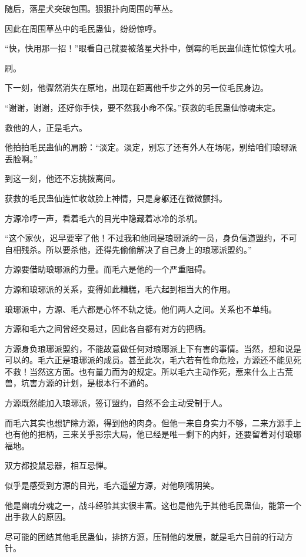 \begin{this_body}
随后，落星犬突破包围。狠狠扑向周围的草丛。

因此在周围草丛中的毛民蛊仙，纷纷惊呼。

“快，快用那一招！”眼看自己就要被落星犬扑中，倒霉的毛民蛊仙连忙惊惶大吼。

刷。

下一刻，他骤然消失在原地，出现在距离他千步之外的另一位毛民身边。

“谢谢，谢谢，还好你手快，要不然我小命不保。”获救的毛民蛊仙惊魂未定。

救他的人，正是毛六。

他拍拍毛民蛊仙的肩膀：“淡定。淡定，别忘了还有外人在场呢，别给咱们琅琊派丢脸啊。”

到这一刻，他还不忘挑拨离间。

获救的毛民蛊仙连忙收敛脸上神情，只是身躯还在微微颤抖。

方源冷哼一声，看着毛六的目光中隐藏着冰冷的杀机。

“这个家伙，迟早要宰了他！不过我和他同是琅琊派的一员，身负信道盟约，不可自相残杀。所以要杀他，还得先偷偷解决了自己身上的琅琊派盟约。”

方源要借助琅琊派的力量。而毛六是他的一个严重阻碍。

方源和琅琊派的关系，变得如此糟糕，毛六起到相当大的作用。

琅琊派中，方源、毛六都是心怀不轨之徒。他们两人之间。关系也不单纯。

方源和毛六之间曾经交易过，因此各自都有对方的把柄。

方源身负琅琊派盟约，不能故意做任何对琅琊派上下有害的事情。当然，想和说是可以的。毛六正是琅琊派的成员。甚至此次，毛六若有性命危险，方源还不能见死不救！当然这方面。也有量力而为的规定。所以毛六主动作死，惹来什么上古荒兽，坑害方源的计划，是根本行不通的。

方源既然能加入琅琊派，签订盟约，自然不会主动受制于人。

而毛六其实也想铲除方源，得到他的肉身。但他一来自身实力不够，二来方源手上也有他的把柄，三来关乎影宗大局，他已经是唯一剩下的内奸，还要留着对付琅琊福地。

双方都投鼠忌器，相互忌惮。

似乎是感受到方源的目光，毛六遥望方源，对他咧嘴阴笑。

他是幽魂分魂之一，战斗经验其实很丰富。这也是他先于其他毛民蛊仙，能第一个出手救人的原因。

尽可能的团结其他毛民蛊仙，排挤方源，压制他的发展，就是毛六目前的行动方针。


\end{this_body}
